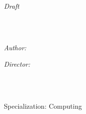 \documentclass[
11pt, %
oneside, %
english, %
singlespacing, %
headsepline, %
table,
]{MastersDoctoralThesis} %
\author{Robert \textsc{Planas}} %
\begin{document}
\frontmatter %

\pagestyle{plain} %


\begin{titlepage}
\begin{center}

\vspace*{.06\textheight}
{\scshape\LARGE \univname\par}\vspace{0.5cm} %
\textsc{\Large \facname}\\[1.5cm] %
\Large{\emph{Draft}}\\[0.5cm] %

\HRule \\[0.4cm] %
{\huge \bfseries \ttitle\par}\vspace{0.4cm} %
\HRule \\[1.5cm] %
 
\begin{minipage}[t]{0.4\textwidth}
\begin{flushleft} \large
\emph{Author:}\\
\href{http://www.hubbit86.com}{\authorname} %
\end{flushleft}
\end{minipage}
\begin{minipage}[t]{0.4\textwidth}
\begin{flushright} \large
\emph{Director:} \\
\href{https://www.cs.upc.edu/~belanche/}{\supname} %
\end{flushright}
\end{minipage}\\[4cm]

\vfill

\large \degreename\\ %
\large Specialization:  Computing\\[0.5cm] %


\end{center}
\end{titlepage}
\end{document}

